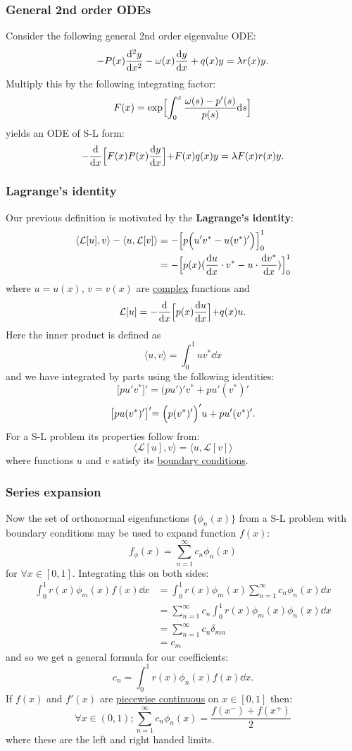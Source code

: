 \documentclass{article}
\begin{document}
\newpage

\subsubsection{General 2nd order ODEs}
Consider the following general 2nd order eigenvalue ODE:
$$-P(x)\dv[2]{y}{x}-\omega(x)\dv{y}{x}+q(x)y=\lambda r(x)y.$$
Multiply this by the following integrating factor:
$$F(x)=\exp\Bigl[\int_{0}^{x}
\frac{\omega(s)-p'(s)}{p(s)}\dd s\Bigl]$$
yields an ODE of S-L form:
$$-\dv{x}\Bigl[F(x)P(x)\dv{y}{x}\Bigl]
+F(x)q(x)y=\lambda F(x)r(x)y.$$

\subsubsection{Lagrange's identity}
Our previous definition is motivated by the \textbf{Lagrange's identity}:
\begin{align*}
    \langle \mathcal{L}[u], v \rangle - \langle u, \mathcal{L}[v] \rangle
    &=-\Bigl[p\Bigl(u'v^*-u(v^*)'\Bigl)\Bigl]_{0}^{1} \\
    &=-\Bigl[p(x)(\dv{u}{x}\cdot v^*-u\cdot\dv{v^*}{x})\Bigl]_{0}^{1}
\end{align*}
where $u=u(x)$, $v=v(x)$ are \underline{complex} functions and
$$\mathcal{L}[u]=-\dv{x}\Bigl[p(x)\dv{u}{x}\Bigl]+q(x)u.$$
Here the inner product is defined as
$$\langle u,v \rangle=\int_{0}^{1}uv^* \dd x$$
and we have integrated by parts using the following identities:
$$\bigl[pu'v^*\bigl]'=\bigl(pu'\bigl)'v^*+pu'(v^*)'$$
$$\bigl[pu(v^*)'\bigl]'=\Bigl(p(v^*)'\Bigl)'u+pu'(v^*)'.$$
For a S-L problem its properties follow from:
$$\langle \mathcal{L}[u], v \rangle=\langle u, \mathcal{L}[v] \rangle$$
where functions $u$ and $v$
satisfy its \underline{boundary conditions}.

\newpage

\subsubsection{Series expansion}
Now the set of orthonormal eigenfunctions $\{\phi_n(x)\}$
from a S-L problem with boundary conditions
may be used to expand function $f(x)$:
$$f_\phi(x)=\sum_{n=1}^{\infty} c_n\phi_n(x)$$
for $\forall x\in[0,1]$. Integrating this on both sides:
\begin{align*}
    \int_{0}^{1}r(x)\phi_m(x)f(x)\dd x
    &=\int_{0}^{1}r(x)\phi_m(x)
    \sum_{n=1}^{\infty} c_n\phi_n(x)\dd x \\
    &=\sum_{n=1}^{\infty} c_n
    \int_{0}^{1}r(x)\phi_m(x)\phi_n(x)\dd x \\
    &=\sum_{n=1}^{\infty} c_n\delta_{mn} \\
    &=c_m
\end{align*}
and so we get a general formula for our coefficients:
$$c_n=\int_{0}^{1}r(x)\phi_n(x)f(x)\dd x.$$
If $f(x)$ and $f'(x)$ are \underline{piecewise continuous}
on $x\in[0,1]$ then:
$$\forall x\in(0,1);\sum_{n=1}^{\infty} c_n\phi_n(x)
=\frac{f(x^-)+f(x^+)}{2}$$
where these are the left and right handed limits.
\end{document}
